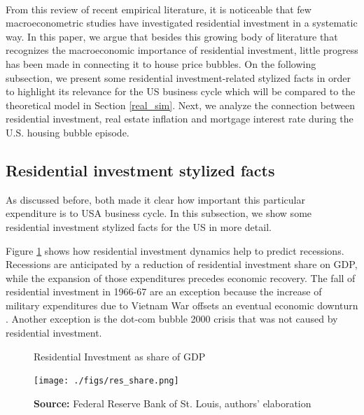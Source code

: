 \documentclass[12pt]{article}
\begin{document}
\\
From this review of recent empirical literature, it is noticeable that few macroeconometric studies have investigated residential investment in a systematic way.
In this paper, we argue that besides this growing body of literature that recognizes the macroeconomic importance of residential investment, little progress has been made in connecting  it to house price bubbles.
On the following subsection, we present some residential investment-related stylized facts in order to highlight its relevance for the US business cycle which will be compared to the theoretical model in Section \ref{real_sim}.
Next, we analyze the connection between residential investment, real estate inflation and mortgage interest rate during the U.S. housing bubble episode.

\subsection{Residential investment stylized facts}
\label{sec:org53a9d64}

As discussed before, both \textcites{green_follow_1997}{leamer_housing_2007} made it clear how important this particular expenditure is to USA business cycle. In this subsection, we show some residential investment stylized facts for the US in more detail.

Figure \ref{Investo_Resid_GDP} shows how residential investment dynamics help to predict recessions. Recessions are anticipated by a reduction of residential investment share on GDP, while the expansion of those expenditures precedes economic recovery. The fall of residential investment in 1966-67 are an exception because the increase of military expenditures due to Vietnam War offsets an eventual economic downturn \cite[p.~20]{leamer_housing_2007}. Another exception is the dot-com bubble 2000 crisis that was not caused by residential investment.



\begin{figure}[htb]
    \centering
        \caption{Residential Investment as share of GDP}
        \label{Investo_Resid_GDP}
    \texttt{[image: ./figs/res\_share.png]}
    \caption*{\textbf{Source:} Federal Reserve Bank of St. Louis, authors’ elaboration}
\end{figure}
\end{document}
